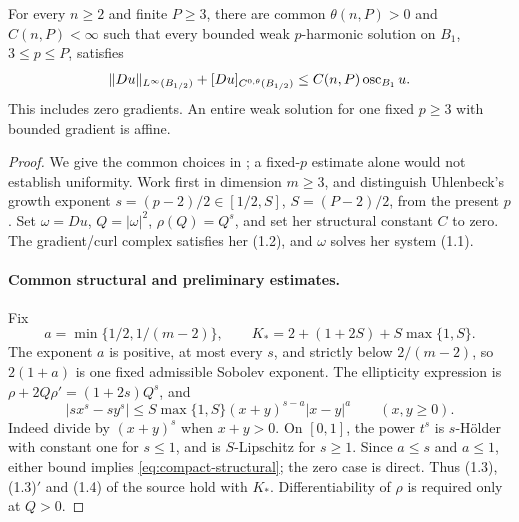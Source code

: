 \begin{lemma}\label{lem:compact-p}
For every $n\geq2$ and finite $P\geq3$, there are common
$\theta(n,P)>0$ and $C(n,P)<\infty$ such that every bounded weak
$p$-harmonic solution on $B_1$, $3\leq p\leq P$, satisfies
\[
 \|Du\|_{L^\infty(B_{1/2})}+[Du]_{C^{0,\theta}(B_{1/2})}
 \leq C(n,P)\operatorname{osc}_{B_1}u.
\]
This includes zero gradients. An entire weak solution for one fixed
$p\geq3$ with bounded gradient is affine.
\end{lemma}
\begin{proof}
We give the common choices in \cite[Sections 1--5]{Uhlenbeck}; a
fixed-$p$ estimate alone would not establish uniformity. Work first
in dimension $m\geq3$, and distinguish Uhlenbeck's growth exponent
$s=(p-2)/2\in[1/2,S]$, $S=(P-2)/2$, from the present $p$. Set
$\omega=Du$, $Q=|\omega|^2$, $\rho(Q)=Q^s$, and set her structural
constant $C$ to zero. The gradient/curl complex satisfies her (1.2),
and $\omega$ solves her system (1.1).

\paragraph{Common structural and preliminary estimates.}
Fix
\[
 a=\min\{1/2,1/(m-2)\},\qquad
 K_*=2+(1+2S)+S\max\{1,S\}.
\]
The exponent $a$ is positive, at most every $s$, and strictly below
$2/(m-2)$, so $2(1+a)$ is one fixed admissible Sobolev exponent.
The ellipticity expression is
$\rho+2Q\rho'=(1+2s)Q^s$, and
\begin{equation}\label{eq:compact-structural}
 |s x^s-s y^s|\leq S\max\{1,S\}(x+y)^{s-a}|x-y|^a
 \qquad(x,y\geq0).
\end{equation}
Indeed divide by $(x+y)^s$ when $x+y>0$. On $[0,1]$, the power
$t^s$ is $s$-H\"older with constant one for $s\leq1$, and is
$S$-Lipschitz for $s\geq1$. Since $a\leq s$ and $a\leq1$, either
bound implies \eqref{eq:compact-structural}; the zero case is direct.
Thus (1.3), (1.3)$'$ and (1.4) of the source hold with $K_*$.
Differentiability of $\rho$ is required only at $Q>0$.


\end{proof}
